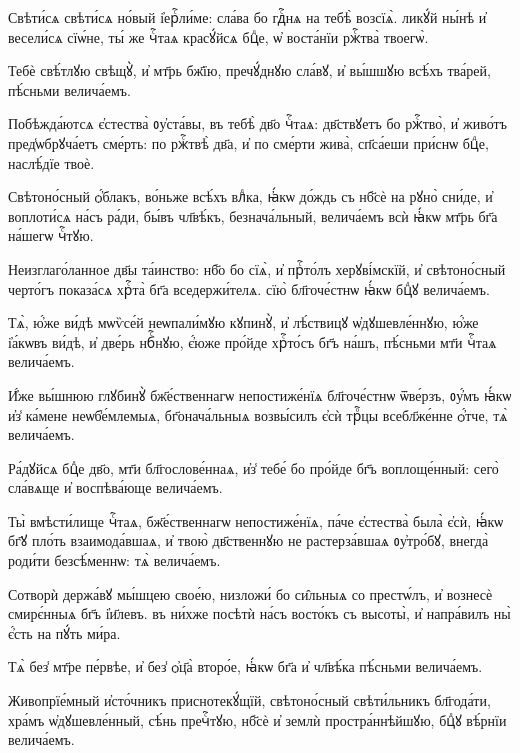 \hKv Свѣти́сѧ свѣти́сѧ но́вый і҆ерⷭ҇ли́ме: сла́ва бо  гдⷭ҇нѧ на тебѣ̀ возсїѧ̀. ликꙋ́й ны́нѣ и҆ весели́сѧ сїѡ́не, ты́ же  чⷭ҇таѧ красꙋ́йсѧ бцⷣе, ѡ҆ воста́нїи ржⷭ҇тва̀ твоегѡ̀. 
%

\hKv Тебѐ свѣ́тлꙋю свѣщꙋ̀, и҆ мт҃рь бж҃їю, пречꙋ́днꙋю  сла́вꙋ, и҆ вы́шшꙋю всѣ́хъ тва́рей, пѣ́сньми велича́емъ. 
%

\hKv Побѣжда́ютсѧ є҆стества̀ ᲂу҆ста́вы, въ  тебѣ̀ дв҃о чⷭ҇таѧ: дв҃ствꙋетъ бо ржⷭ҇тво̀, и҆ живо́тъ  пред̾ѡбрꙋча́етъ сме́рть:  по ржⷭ҇твѣ̀  дв҃а, и҆ по сме́рти жива̀, сп҃са́еши при́снѡ бцⷣе, наслѣ́дїе твоѐ. 
%

\hKv Свѣтоно́сный ѻ҆́блакъ, во́ньже всѣ́хъ влⷣка, ꙗ҆́кѡ до́ждь съ  нб҃сѐ на рꙋно̀ сни́де, и҆ воплоти́сѧ на́съ ра́ди, бы́въ чл҃вѣ́къ,  безнача́льный, велича́емъ всѝ ꙗ҆́кѡ мт҃рь бг҃а на́шегѡ чⷭ҇тꙋю. 

\hKv Неизглаго́ланное дв҃ы та́инство: нб҃о бо сїѧ̀, и҆ прⷭ҇то́лъ  херꙋві́мскїй, и҆ свѣтоно́сный черто́гъ показа́сѧ хрⷭ҇та̀ бг҃а  вседержи́телѧ. сїю̀ бл҃гоче́стнѡ ꙗ҆́кѡ бцⷣꙋ велича́емъ. 

\hKv Тѧ̀, ю҆́же ви́дѣ мѡѷсе́й неѡпали́мꙋю кꙋпинꙋ̀, и҆ лѣ́ствицꙋ  ѡ҆дꙋшевле́ннꙋю, ю҆́же і҆а́кѡвъ ви́дѣ, и҆ две́рь нбⷭ҇нꙋю, є҆́юже  про́йде хрⷭ҇то́съ бг҃ъ на́шъ, пѣ́сньми мт҃и чⷭ҇таѧ велича́емъ. 

\hKv И҆́же вы́шнюю глꙋбинꙋ̀ бж҃е́ственнагѡ непостиже́нїѧ бл҃гоче́стнѡ  ѿве́рзъ, ᲂу҆́мъ ꙗ҆́кѡ и҆з̾ ка́мене неѡб̾е́млемыѧ,  бг҃онача́льныѧ возвы́силъ є҆сѝ трⷪ҇цы всебл҃же́нне ѻ҆́тче, тѧ̀  велича́емъ.  

\hKv Ра́дꙋйсѧ бцⷣе дв҃о, мт҃и бл҃гослове́ннаѧ, и҆з̾ тебе́ бо про́йде  бг҃ъ воплоще́нный: сего̀ сла́вѧще и҆ воспѣва́юще велича́емъ. 

\hKv Ты̀ вмѣсти́лище чⷭ҇таѧ, бж҃е́ственнагѡ непостиже́нїѧ, па́че  є҆стества̀ была̀ є҆сѝ, ꙗ҆́кѡ бг҃ꙋ пло́ть взаимода́вшаѧ, и҆ твою̀  дв҃ственнꙋю не растерза́вшаѧ ᲂу҆тро́бꙋ, внегда̀ роди́ти безсѣ́меннѡ:  тѧ̀ велича́емъ. 

\hKv Сотворѝ держа́вꙋ мы́шцею свое́ю, низложи́ бо си̑льныѧ со  престѡ́лъ, и҆ вознесѐ смирє́нныѧ бг҃ъ і҆и҃левъ. въ ни́хже посѣтѝ  на́съ восто́къ съ высоты̀, и҆ напра́вилъ ны̀ є҆́сть на пꙋ́ть ми́ра. 

\hKv Тѧ̀ без̾ мт҃ре пе́рвѣе, и҆ без̾ ѻ҆ц҃а̀ второ́е, ꙗ҆́кѡ бг҃а  и҆ чл҃вѣ́ка пѣ́сньми велича́емъ. 

\hKv Живопрїе́мный и҆сто́чникъ приснотекꙋ́щїй, свѣтоно́сный  свѣти́льникъ бл҃года́ти, хра́мъ ѡ҆дꙋшевле́нный, сѣ́нь пречⷭ҇тꙋю,  нб҃сѐ и҆ землѝ простра́ннѣйшꙋю, бцⷣꙋ вѣ́рнїи велича́емъ.  

